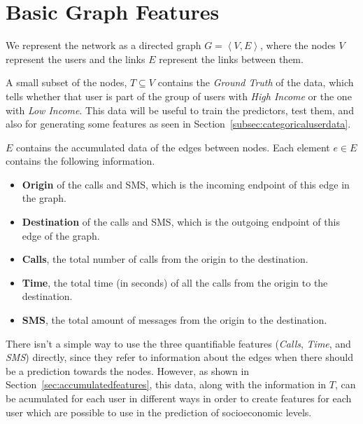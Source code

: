 \section{Basic Graph Features}
\label{sec:graphfeatures}

We represent the network as a directed graph $G = \left< V, E \right>$, where the nodes $V$ represent the users and the links $E$ represent the links between them.

A small subset of the nodes, $T \subseteq V$ contains the \emph{Ground Truth} of the data, which tells whether that user is part of the group of users with \emph{High Income} or the one with \emph{Low Income}. This data will be useful to train the predictors, test them, and also for generating some features as seen in Section~\ref{subsec:categoricaluserdata}.

$E$ contains the accumulated data of the edges between nodes. Each element $e \in E$ contains the following information.

\begin{itemize}
	\item \textbf{Origin} of the calls and SMS, which is the incoming endpoint of this edge in the graph.
	\item \textbf{Destination} of the calls and SMS, which is the outgoing endpoint of this edge of the graph.
	\item \textbf{Calls}, the total number of calls from the origin to the destination.
	\item \textbf{Time}, the total time (in seconds) of all the calls from the origin to the destination.
	\item \textbf{SMS}, the total amount of messages from the origin to the destination.
\end{itemize}

There isn't a simple way to use the three quantifiable features (\emph{Calls}, \emph{Time}, and \emph{SMS}) directly, since they refer to information about the edges when there should be a prediction towards the nodes. However, as shown in Section~\ref{sec:accumulatedfeatures}, this data, along with the information in $T$, can be acumulated for each user in different ways in order to create features for each user which are possible to use in the prediction of socioeconomic levels.
